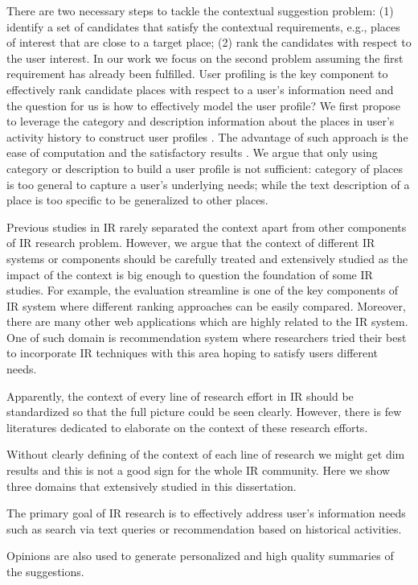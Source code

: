 There are two necessary steps to tackle the contextual suggestion problem: 
(1) identify a set of candidates that satisfy the contextual 
requirements, e.g., places of interest that are close to a target place; 
(2) rank the candidates with respect to the user interest. 
In our work we focus on the second problem assuming the first requirement 
has already been fulfilled. 
User profiling is the key component to effectively rank candidate places 
with respect to a user's information need and the question for us is how 
to effectively model the user profile? We first propose to leverage the 
category and description information about the places in user's activity 
history to construct user profiles \cite{udel:treccs2012}. 
The advantage of such approach is the ease of computation and the satisfactory 
results \cite{adriel:overview}. 
We argue that only using category 
or description to build a user profile is not sufficient: category of places 
is too general to capture a user's underlying needs; while the text 
description of a place is too specific to be generalized to other places.

Previous studies in IR rarely separated the context apart from other 
components of IR research problem. However, we argue that the context of 
different IR systems or components should be carefully treated and extensively 
studied as the impact of the context is big enough to question the foundation 
of some IR studies.
For example, the evaluation streamline is one of the key 
components of IR system where different ranking approaches can be 
easily compared. Moreover, there are many other web applications which 
are highly related to the IR system. One of such domain is recommendation 
system where researchers tried their best to incorporate IR techniques 
with this area hoping to satisfy users different needs.

Apparently, the context of 
every line of research effort in IR should be standardized so that the 
full picture could be seen clearly. 
However, there is few literatures dedicated to elaborate on the context 
of these research efforts.



Without clearly defining of the context of each line of research we might get  
dim results and this is not a good sign for the whole IR community. 
Here we show three domains that extensively studied in this dissertation. 




The primary goal of IR research is to effectively address user's 
information needs such as search via text queries or recommendation 
based on historical activities. 

Opinions are also used to generate personalized and high 
quality summaries of the suggestions. 